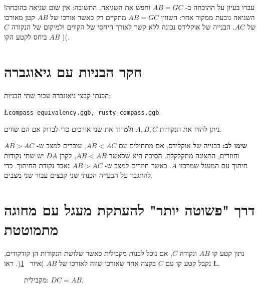 \documentclass[12pt,a4paper]{article}
\begin{document}
עברו בעיון על ההוכחה ב-%
$AB=GC$
וחפש את השגיאה. התשובה: אין שום שגיאה בהוכחה! השגיאה נובעת ממקור אחר: השווין
$AB=GC$
מתקיים רק כאשר אורכו של 
$AB$
קטן מאורכו של
$AC$.
הבנייה של אוקלידס נכונה ללא קשר לאורך היחסי של הקווים ולמיקום של הנקודה
$C$
ביחס לקטע הקו
$AB$
)\cite{toussaint}(.


\section{%
חקר הבניות עם גיאוגברה%
}
הכנתי קבצי גיאוגברה עבור שתי הבניות:
\begin{center}
\L{\texttt{compass-equivalency.ggb, rusty-compass.ggb}}.
\end{center}
ניתן להזיז את הנקודות
$A,B,C$
ולמדוד את שני אורכים כדי לבדוק אם הם שווים.

\textbf{%
שימו לב:%
}
בבנייה של אוקלידס, אם מתחילים עם 
$AB<AC$,
עוברים למצב ש-%
$AB>AC$
וחוזרים, התצוגה מתקלקלת. הסיבה היא שכאשר
$AB<AB$,
לקרן
$DA$
יש שתי נקודות חיתוך עם המעגל שמרכזו
$A$.
כאשר חוזרים למצב ש-%
$AB>AC$
נאבד נקודת החיתוך. כדי להתגבר על הבעייה הכנתי שני קבצים עבור שני מצבים.


\section{
דרך "פשוטה יותר" להעתקת מעגל עם מחוגה מתמוטטת
}

נתון קטע קו 
$AB$
ונקודה
$C$,
אם נוכל לבנות מקבילית כאשר שלושת הנקודות הן קודקודים, נקבל קטע קו עם 
$C$
בקצה אחד שאורכו שווה לאורכו של
$AB$
)איור~%
\ref{fig.parallel-1}(.
ראו
\L{\cite[%
207--208
%
]{roads}}.


\begin{figure}[H]
\begin{center}
\caption{%
מקבילית: 
$DC=AB$.%
}\label{fig.parallel-1}
\end{center}
\end{figure}
\end{document}
